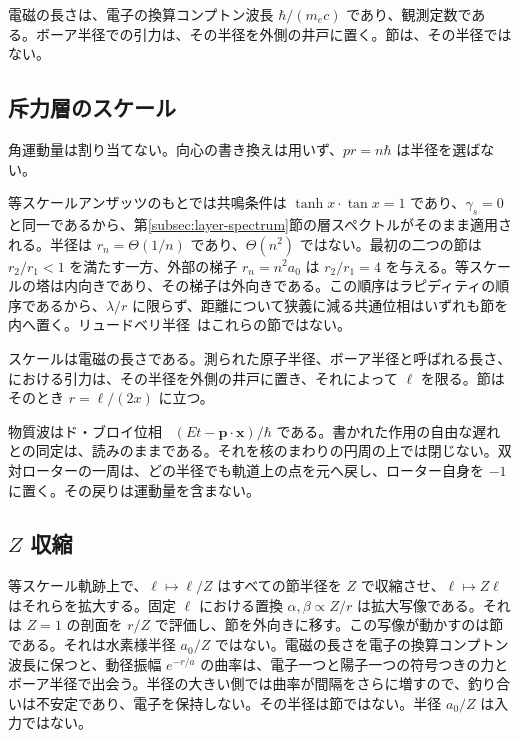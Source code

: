 \documentclass[a4paper]{article}
\begin{document}
電磁の長さは、電子の換算コンプトン波長 \(\hbar/(m_e c)\) であり、観測定数である。ボーア半径での引力は、その半径を外側の井戸に置く。節は、その半径ではない。

\subsection{斥力層のスケール}

角運動量は割り当てない。向心の書き換えは用いず、\(pr=n\hbar\) は半径を選ばない。

等スケールアンザッツのもとでは共鳴条件は \(\tanh x\cdot\tan x=1\) であり、\(\gamma_s=0\) と同一であるから、第\ref{subsec:layer-spectrum}節の層スペクトルがそのまま適用される。半径は \(r_n=\Theta(1/n)\) であり、\(\Theta(n^2)\) ではない。最初の二つの節は \(r_2/r_1<1\) を満たす一方、外部の梯子 \(r_n=n^2 a_0\) は \(r_2/r_1=4\) を与える。等スケールの塔は内向きであり、その梯子は外向きである。この順序はラピディティの順序であるから、\(\lambda/r\) に限らず、距離について狭義に減る共通位相はいずれも節を内へ置く。リュードベリ半径~\cite{rydberg1890}はこれらの節ではない。

スケールは電磁の長さである。測られた原子半径、ボーア半径と呼ばれる長さ、における引力は、その半径を外側の井戸に置き、それによって \(\ell\) を限る。節はそのとき \(r=\ell/(2x)\) に立つ。

物質波はド・ブロイ位相~\cite{debroglie1924} \((Et-\mathbf{p}\cdot\mathbf{x})/\hbar\) である。書かれた作用の自由な遅れとの同定は、読みのままである。それを核のまわりの円周の上では閉じない。双対ローターの一周は、どの半径でも軌道上の点を元へ戻し、ローター自身を \(-1\) に置く。その戻りは運動量を含まない。

\subsection{\texorpdfstring{$Z$ 収縮}{Z contraction}}

等スケール軌跡上で、\(\ell\mapsto\ell/Z\) はすべての節半径を \(Z\) で収縮させ、\(\ell\mapsto Z\ell\) はそれらを拡大する。固定 \(\ell\) における置換 \(\alpha,\beta\propto Z/r\) は拡大写像である。それは \(Z=1\) の剖面を \(r/Z\) で評価し、節を外向きに移す。この写像が動かすのは節である。それは水素様半径 \(a_0/Z\) ではない。電磁の長さを電子の換算コンプトン波長に保つと、動径振幅 \(e^{-r/a}\) の曲率は、電子一つと陽子一つの符号つきの力とボーア半径で出会う。半径の大きい側では曲率が間隔をさらに増すので、釣り合いは不安定であり、電子を保持しない。その半径は節ではない。半径 \(a_0/Z\) は入力ではない。
\end{document}
